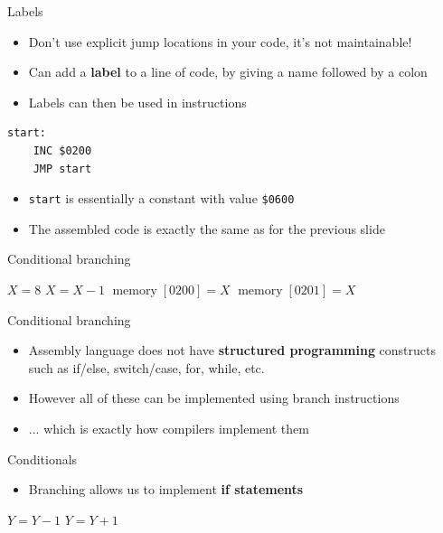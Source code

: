 \begin{frame}[fragile]{Labels}
	\begin{itemize}
		\pause\item Don't use explicit jump locations in your code, it's not maintainable!
		\pause\item Can add a \textbf{label} to a line of code, by giving a name followed by a colon
		\pause\item Labels can then be used in instructions
	\end{itemize}
	\pause
	\begin{lstlisting}
start:
    INC $0200
    JMP start
	\end{lstlisting}
	\begin{itemize}
		\pause\item \lstinline{start} is essentially a constant with value \lstinline{$0600}
		\pause\item The assembled code is exactly the same as for the previous slide
	\end{itemize}
\end{frame}

\begin{frame}[fragile]{Conditional branching}
	\pause
	
	\pause
	\begin{algorithmic}
		\State $X = 8$
		\Do
			\State $X = X-1$
			\State $\operatorname{memory}[0200] = X$
		\State $\operatorname{memory}[0201] = X$
	\end{algorithmic}
\end{frame}

\begin{frame}[fragile]{Conditional branching}
	\begin{itemize}
		\pause\item Assembly language does not have \textbf{structured programming} constructs
			such as if/else, switch/case, for, while, etc.
		\pause\item However all of these can be implemented using branch instructions
		\pause\item ... which is exactly how compilers implement them
	\end{itemize}
\end{frame}

\begin{frame}[fragile]{Conditionals}
	\begin{itemize}
		\pause\item Branching allows us to implement \textbf{if statements}
	\end{itemize}
	\pause
	
	\pause
	\begin{algorithmic}
		\If{$X \geq 1$}
			\State $Y = Y-1$
		\Else
			\State $Y = Y+1$
		\EndIf
	\end{algorithmic}
\end{frame}


